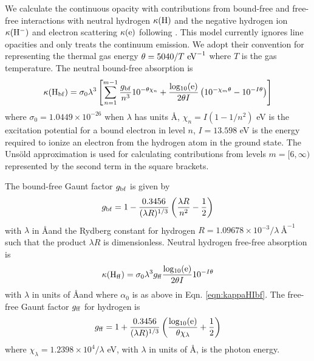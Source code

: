 We calculate the continuous opacity with contributions from bound-free and free-free interactions with neutral hydrogen $\kappa({\rm H})$ and the negative hydrogen ion $\kappa({\rm H^-})$ and electron scattering $\kappa({\rm e})$ following \citet{Gray21}.
This model currently ignores line opacities and only treats the continuum emission.
We adopt their convention for representing the thermal gas energy $\theta = 5040/T\ {\rm eV}^{-1}$ where $T$ is the gas temperature.
The neutral bound-free absorption is 
\begin{equation}\label{eqn:kappaHIbf}
    \kappa({\rm H_{bf}}) = \sigma_0 \lambda^3  \left[ \sum_{n=1}^{m-1} \frac{g_{\rm bf}}{n^3}10^{-\theta \chi_n} + \frac{\rm log_{10}(e)}{2\theta I} \left(10^{-\chi_m \theta} - 10^{-I\theta} \right) \right]
\end{equation}
where $\sigma_0 = 1.0449 \times 10^{-26}$ when $\lambda$ has units \AA, $\chi_{n} = I(1-1/n^2)$ eV is the excitation potential for a bound electron in level $n$, $I=13.598$ eV is the energy required to ionize an electron from the hydrogen atom in the ground state.
The Uns\"old approximation is used for calculating contributions from levels $m=[6, \infty)$ represented by the second term in the square brackets.

The bound-free Gaunt factor $g_{\rm bf}$ is given by
\begin{equation}\label{eqn:gauntHIbf}
    g_{\rm bf} = 1 - \frac{0.3456}{(\lambda R)^{1/3}} \left( \frac{\lambda R}{n^2} - \frac{1}{2} \right)
\end{equation}
with $\lambda$ in \AA and the Rydberg constant for hydrogen $R = 1.09678 \times 10^{-3} / \lambda \ {\text{\AA}^{-1}}$ such that the product $\lambda R$ is dimensionless. Neutral hydrogen free-free absorption is
\begin{equation}\label{eqn:kappaHIff}
    \kappa({\rm H_{ff}}) = \sigma_0 \lambda^3 g_{\rm ff} \frac{\rm log_{10}(e)}{2\theta I} 10^{-I\theta}
\end{equation}
with $\lambda$ in units of \AA and where $\alpha_0$ is as above in Eqn. \ref{eqn:kappaHIbf}. The free-free Gaunt factor $g_{\rm ff}$ for hydrogen is
\begin{equation}
    g_{\rm ff} = 1 + \frac{0.3456}{(\lambda R)^{1/3}} \left( \frac{\rm log_{10}(e)}{\theta \chi_{\lambda}} + \frac{1}{2} \right)
\end{equation}
where $\chi_{\lambda} = 1.2398 \times 10^4 / \lambda$ eV, with $\lambda$ in units of \AA, is the photon energy.


